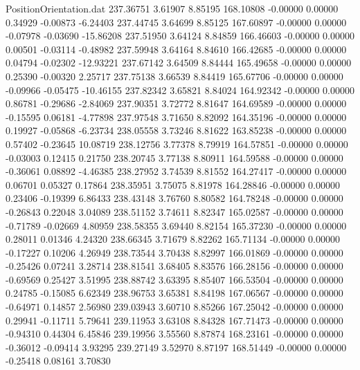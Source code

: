 \begin{filecontents}{PositionOrientation.dat}
 237.36751    3.61907    8.85195   168.10808   -0.00000    0.00000    0.34929   -0.00873   -6.24403
 237.44745    3.64699    8.85125   167.60897   -0.00000    0.00000   -0.07978   -0.03690  -15.86208
 237.51950    3.64124    8.84859   166.46603   -0.00000    0.00000    0.00501   -0.03114   -0.48982
 237.59948    3.64164    8.84610   166.42685   -0.00000    0.00000    0.04794   -0.02302  -12.93221
 237.67142    3.64509    8.84444   165.49658   -0.00000    0.00000    0.25390   -0.00320    2.25717
 237.75138    3.66539    8.84419   165.67706   -0.00000    0.00000   -0.09966   -0.05475  -10.46155
 237.82342    3.65821    8.84024   164.92342   -0.00000    0.00000    0.86781   -0.29686   -2.84069
 237.90351    3.72772    8.81647   164.69589   -0.00000    0.00000   -0.15595    0.06181   -4.77898
 237.97548    3.71650    8.82092   164.35196   -0.00000    0.00000    0.19927   -0.05868   -6.23734
 238.05558    3.73246    8.81622   163.85238   -0.00000    0.00000    0.57402   -0.23645   10.08719
 238.12756    3.77378    8.79919   164.57851   -0.00000    0.00000   -0.03003    0.12415    0.21750
 238.20745    3.77138    8.80911   164.59588   -0.00000    0.00000   -0.36061    0.08892   -4.46385
 238.27952    3.74539    8.81552   164.27417   -0.00000    0.00000    0.06701    0.05327    0.17864
 238.35951    3.75075    8.81978   164.28846   -0.00000    0.00000    0.23406   -0.19399    6.86433
 238.43148    3.76760    8.80582   164.78248   -0.00000    0.00000   -0.26843    0.22048    3.04089
 238.51152    3.74611    8.82347   165.02587   -0.00000    0.00000   -0.71789   -0.02669    4.80959
 238.58355    3.69440    8.82154   165.37230   -0.00000    0.00000    0.28011    0.01346    4.24320
 238.66345    3.71679    8.82262   165.71134   -0.00000    0.00000   -0.17227    0.10206    4.26949
 238.73544    3.70438    8.82997   166.01869   -0.00000    0.00000   -0.25426    0.07241    3.28714
 238.81541    3.68405    8.83576   166.28156   -0.00000    0.00000   -0.69569    0.25427    3.51995
 238.88742    3.63395    8.85407   166.53504   -0.00000    0.00000    0.24785   -0.15085    6.62349
 238.96753    3.65381    8.84198   167.06567   -0.00000    0.00000   -0.64971    0.14857    2.56980
 239.03943    3.60710    8.85266   167.25042   -0.00000    0.00000    0.29941   -0.11711    5.79641
 239.11953    3.63108    8.84328   167.71473   -0.00000    0.00000   -0.94310    0.44304    6.45846
 239.19956    3.55560    8.87874   168.23161   -0.00000    0.00000   -0.36012   -0.09414    3.93295
 239.27149    3.52970    8.87197   168.51449   -0.00000    0.00000   -0.25418    0.08161    3.70830

\end{filecontents}
